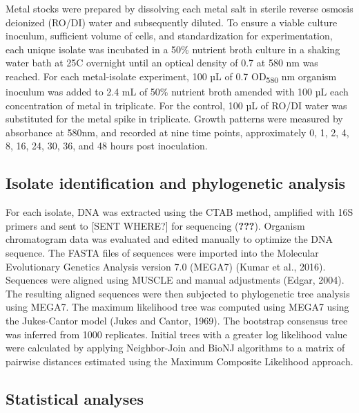 \documentclass[ms]{uncgdissertationexp}
\theoremstyle{plain}
\theoremstyle{definition}
\theoremstyle{remark}
\begin{document}
  Metal stocks were prepared by dissolving each metal salt in sterile
  reverse osmosis deionized (RO/DI) water and subsequently diluted. To
  ensure a viable culture inoculum, sufficient volume of cells, and
  standardization for experimentation, each unique isolate was incubated
  in a 50\% nutrient broth culture in a shaking water bath at 25C
  overnight until an optical density of 0.7 at 580 nm was reached. For
  each metal-isolate experiment, 100 µL of 0.7 OD\textsubscript{580} nm
  organism inoculum was added to 2.4 mL of 50\% nutrient broth amended
  with 100 µL each concentration of metal in triplicate. For the control,
  100 µL of RO/DI water was substituted for the metal spike in triplicate.
  Growth patterns were measured by absorbance at 580nm, and recorded at
  nine time points, approximately 0, 1, 2, 4, 8, 16, 24, 30, 36, and 48
  hours post inoculation.
  
  \subsection{Isolate identification and phylogenetic
  analysis}\label{isolate-identification-and-phylogenetic-analysis}
  
  For each isolate, DNA was extracted using the CTAB method, amplified
  with 16S primers and sent to {[}SENT WHERE?{]} for sequencing
  ({\textbf{???}}). Organism chromatogram data was evaluated and edited
  manually to optimize the DNA sequence. The FASTA files of sequences were
  imported into the Molecular Evolutionary Genetics Analysis version 7.0
  (MEGA7) (Kumar et al., 2016). Sequences were aligned using MUSCLE and
  manual adjustments (Edgar, 2004). The resulting aligned sequences were
  then subjected to phylogenetic tree analysis using MEGA7. The maximum
  likelihood tree was computed using MEGA7 using the Jukes-Cantor model
  (Jukes and Cantor, 1969). The bootstrap consensus tree was inferred from
  1000 replicates. Initial trees with a greater log likelihood value were
  calculated by applying Neighbor-Join and BioNJ algorithms to a matrix of
  pairwise distances estimated using the Maximum Composite Likelihood
  approach.
  
  \subsection{Statistical analyses}\label{statistical-analyses}
  
\end{document}

